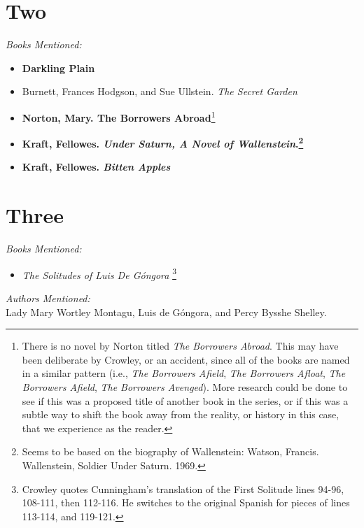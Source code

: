 \documentclass[twoside,10pt]{report}
\begin{document}
\section{Two}
\textit{Books Mentioned:}
\begin{itemize}
\item \textbf{Darkling Plain}
\item Burnett, Frances Hodgson, and Sue Ullstein. \textit{The Secret Garden}\cite{Burnett1975}
\item \textbf{Norton, Mary. The Borrowers Abroad}\footnote{There is no novel by Norton titled \textit{The Borrowers Abroad}. This may have been deliberate by Crowley, or an accident, since all of the books are named in a similar pattern (i.e., \textit{The Borrowers Afield}, \textit{The Borrowers Afloat}, \textit{The Borrowers Afield}, \textit{The Borrowers Avenged}). More research could be done to see if this was a proposed title of another book in the series, or if this was a subtle way to shift the book away from the reality, or history in this case, that we experience as the reader.}
\item \textbf{Kraft, Fellowes. \textit{Under Saturn, A  Novel of Wallenstein}.\footnote{Seems to be based on the biography of Wallenstein: Watson, Francis. Wallenstein, Soldier Under Saturn. 1969.}}
\item \textbf{Kraft, Fellowes. \textit{Bitten Apples}}
\end{itemize}

\section{Three}
\textit{Books Mentioned:}
\begin{itemize}
\item \textit{The Solitudes of Luis De Góngora} \cite{DeGongoraYArgote1968}\footnote{Crowley quotes Cunningham’s translation of the First Solitude lines 94-96, 108-111, then 112-116. He switches to the original Spanish for pieces of lines 113-114, and 119-121.}
\end{itemize}
\textit{Authors Mentioned:}\\
Lady Mary Wortley Montagu, Luis de Góngora, and Percy Bysshe Shelley.
\end{document}

